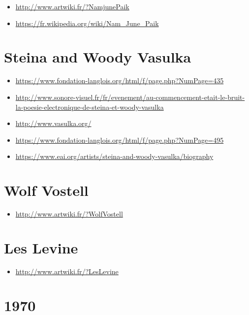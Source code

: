 \documentclass[
  french,
]{book}
\providecommand{\tightlist}{%
  \setlength{\itemsep}{0pt}\setlength{\parskip}{0pt}}
\begin{document}
\begin{itemize}
\tightlist
\item
  \url{http://www.artwiki.fr/?NamjunePaik}
\item
  \url{https://fr.wikipedia.org/wiki/Nam_June_Paik}
\end{itemize}

\hypertarget{steina-and-woody-vasulka}{%
\section{Steina and Woody Vasulka}\label{steina-and-woody-vasulka}}

\begin{itemize}
\tightlist
\item
  \url{https://www.fondation-langlois.org/html/f/page.php?NumPage=435}
\item
  \url{http://www.sonore-visuel.fr/fr/evenement/au-commencement-etait-le-bruit-la-poesie-electronique-de-steina-et-woody-vasulka}
\item
  \url{http://www.vasulka.org/}
\item
  \url{https://www.fondation-langlois.org/html/f/page.php?NumPage=495}
\item
  \url{https://www.eai.org/artists/steina-and-woody-vasulka/biography}
\end{itemize}

\hypertarget{wolf-vostell}{%
\section{Wolf Vostell}\label{wolf-vostell}}

\begin{itemize}
\tightlist
\item
  \url{http://www.artwiki.fr/?WolfVostell}
\end{itemize}

\hypertarget{les-levine}{%
\section{Les Levine}\label{les-levine}}

\begin{itemize}
\tightlist
\item
  \url{http://www.artwiki.fr/?LesLevine}
\end{itemize}

\hypertarget{section}{%
\section{1970}\label{section}}
\end{document}
